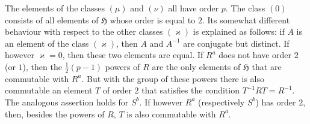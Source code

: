\documentclass[11pt]{article}
\newcommand{\grp}{\mathfrak{H}}
\begin{document}
The elements of the classes $(\mu)$ and $(\nu)$ all have order $p$. The class $(0)$ consists of all elements of $\grp$ whose order is equal to $2$. Its somewhat different behaviour with respect to the other classes $(\varkappa)$ is explained as follows: if $A$ is an element of the class $(\varkappa)$, then $A$ and $A^{-1}$ are conjugate but distinct. If however $\varkappa=0$, then these two elements are equal. If $R^a$ does not have order $2$ (or $1$), then the $\frac12(p-1)$ powers of $R$ are the only elements of $\grp$ that are commutable with $R^a$. But with the group of these powers there is also commutable an element $T$ of order $2$ that satisfies the condition $T^{-1}RT=R^{-1}$. The analogous assertion holds for $S^b$. If however $R^a$ (respectively $S^b$) has order $2$, then, besides the powers of $R$, $T$ is also commutable with $R^a$.
\end{document}
